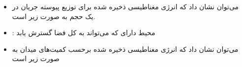 \begin{ELimportant}{}


\end{ELimportant}

\begin{ELjoin}

\begin{itemize}
\tightlist
\item
  می‌توان نشان داد که انرژی مغناطیسی ذخیره شده برای توزیع پیوسته جریان در یک حجم به صورت زیر است.
\end{itemize}

\begin{ELimportant}{}


\end{ELimportant}

\end{ELjoin}

\begin{ELjoin}

\begin{itemize}
\tightlist
\item
  : محیط دارای  که می‌تواند به کل فضا گسترش یابد
\item
  می‌توان نشان داد که انرژی مغناطیسی ذخیره شده برحسب کمیت‌های میدان به صورت زیر است
\end{itemize}

\begin{ELimportant}{}


\end{ELimportant}

\end{ELjoin}

